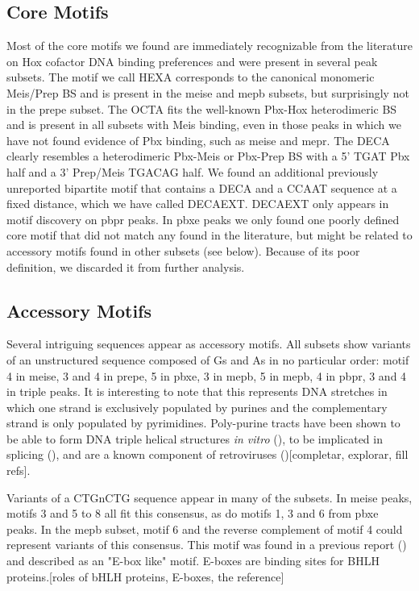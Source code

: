 \subsection{Core Motifs}

Most of the core motifs we found are immediately recognizable from the literature on Hox cofactor DNA binding preferences and were present in several peak subsets. The motif we call \ac{HEXA} corresponds to the canonical monomeric Meis/Prep \ac{BS} and is present in the \ac{meise} and \ac{mepb} subsets, but surprisingly not in the \ac{prepe} subset. The \ac{OCTA} fits the well-known Pbx-Hox heterodimeric \ac{BS} and is present in all subsets with Meis binding, even in those peaks in which we have not found evidence of Pbx binding, such as \ac{meise} and \ac{mepr}. The \ac{DECA} clearly resembles a heterodimeric Pbx-Meis or Pbx-Prep \ac{BS} with a 5' TGAT Pbx half and a 3' Prep/Meis TGACAG half. We found an additional previously unreported bipartite motif that contains a \ac{DECA} and a CCAAT sequence at a fixed distance, which we have called \ac{DECAEXT}. \ac{DECAEXT} only appears in motif discovery on \ac{pbpr} peaks. In \ac{pbxe} peaks we only found one poorly defined core motif that did not match any found in the literature, but might be related to accessory motifs found in other subsets (see below). Because of its poor definition, we discarded it from further analysis.

\subsection{Accessory Motifs}
\label{ssc:accessoryMotifs}

Several intriguing sequences appear as accessory motifs. All subsets show variants of an unstructured sequence composed of Gs and As in no particular order: motif 4 in \ac{meise}, 3 and 4 in \ac{prepe}, 5 in \ac{pbxe}, 3 in \ac{mepb}, 5 in \ac{mepb}, 4 in \ac{pbpr}, 3 and 4 in triple peaks. It is interesting to note that this represents DNA stretches in which one strand is exclusively populated by purines and the complementary strand is only populated by pyrimidines. Poly-purine tracts have been shown to be able to form DNA triple helical structures \textit{in vitro} (\cite{ref}), to be implicated in splicing (\cite{ref}), and are a known component of retroviruses (\cite{ref})[completar, explorar, fill refs].

Variants of a CTGnCTG sequence appear in many of the subsets. In \ac{meise} peaks, motifs 3 and 5 to 8 all fit this consensus, as do motifs 1, 3 and 6 from \ac{pbxe} peaks. In the \ac{mepb} subset, motif 6 and the reverse complement of motif 4 could represent variants of this consensus. This motif was found in a previous report (\cite{ref?}) and described as an "E-box like" motif. E-boxes are binding sites for \ac{BHLH} proteins.[roles of bHLH proteins, E-boxes, the reference]

